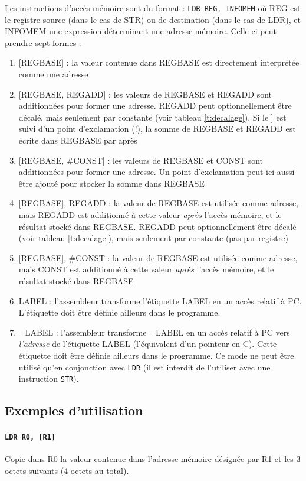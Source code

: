 \documentclass{tufte-handout}
\begin{document}
Les instructions d'accès mémoire sont du format : \texttt{LDR REG, INFOMEM} où REG est le registre source (dans le cas de STR) ou de destination (dans le cas de LDR), et INFOMEM une expression déterminant une adresse mémoire. Celle-ci peut prendre sept formes :
\begin{enumerate}
	\item {[REGBASE] : la valeur contenue dans REGBASE est directement interprétée comme une adresse}
	\item {[REGBASE, REGADD] : les valeurs de REGBASE et REGADD sont additionnées pour former une adresse. REGADD peut optionnellement être décalé, mais seulement par constante (voir tableau \ref{t:decalage}). Si le ] est suivi d'un point d'exclamation (!), la somme de REGBASE et REGADD est écrite dans REGBASE par après}
	\item {[REGBASE, \#CONST] : les valeurs de REGBASE et CONST sont additionnées pour former une adresse. Un point d'exclamation peut ici aussi être ajouté pour stocker la somme dans REGBASE}
	\item {[REGBASE], REGADD : la valeur de REGBASE est utilisée comme adresse, mais REGADD est additionné à cette valeur \textit{après} l'accès mémoire, et le résultat stocké dans REGBASE. REGADD peut optionnellement être décalé (voir tableau \ref{t:decalage}), mais seulement par constante (pas par registre)}
	\item {[REGBASE], \#CONST : la valeur de REGBASE est utilisée comme adresse, mais CONST est additionné à cette valeur \textit{après} l'accès mémoire, et le résultat stocké dans REGBASE}
	\item LABEL : l'assembleur transforme l'étiquette LABEL en un accès relatif à PC. L'étiquette doit être définie ailleurs dans le programme.
	\item =LABEL : l'assembleur transforme =LABEL en un accès relatif à PC vers \textit{l'adresse} de l'étiquette LABEL (l'équivalent d'un pointeur en C). Cette étiquette doit être définie ailleurs dans le programme. Ce mode ne peut être utilisé qu'en conjonction avec \texttt{LDR} (il est interdit de l'utiliser avec une instruction \texttt{STR}).
\end{enumerate}

\subsection{Exemples d'utilisation}

\paragraph{\texttt{LDR R0, [R1]}} Copie dans R0 la valeur contenue dans l'adresse mémoire désignée par R1 et les 3 octets suivants (4 octets au total).
\end{document}

